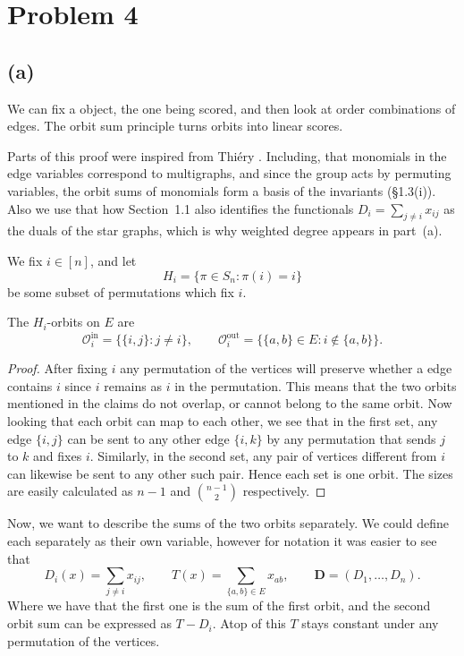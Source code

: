\documentclass[11pt]{scrartcl}
\begin{document}
\section{Problem 4}
\subsection{(a)}

\begin{soln}
    We can fix a object, the one being scored, and then look at order combinations of edges. The orbit sum principle turns orbits into linear scores. 
    \begin{remark}
            Parts of this proof were inspired from Thi\'ery \cite[Sections~1.1 and~1.3]{p4-thiery}.
    Including, that  monomials in the edge variables correspond to multigraphs, and since
the group acts by permuting variables, the orbit sums of monomials form
a basis of the invariants (\S1.3(i)). Also we use that how Section~1.1 also identifies the
functionals $D_i=\sum_{j\ne i}x_{ij}$ as the duals of the star
graphs, which is why weighted degree appears in part~(a).
    \end{remark}
    We fix $i\in[n]$, and let
    \[
    H_i=\{\pi\in S_n:\pi(i)=i\}
    \]
    be some subset of permutations which fix $i$.

    \begin{claim*}
	
        The $H_i$-orbits on $E$ are
        \[
        \mathcal O_i^{\mathrm{in}}
        =\{\{i,j\}:j\ne i\},
        \qquad
        \mathcal O_i^{\mathrm{out}}
        =\{\{a,b\}\in E:i\notin\{a,b\}\}.
        \]
    \end{claim*}

    \begin{proof}
		After fixing $i$ any permutation of the vertices will preserve whether a edge
		contains $i$ since $i$ remains as $i$ in the permutation. This means that the
		two orbits mentioned in the claims do not overlap, or cannot belong to the same 
		orbit. Now looking that each orbit can map to each other, we see that in the first
		set, any edge $\{i,j\}$ can be sent to any other edge $\{i,k\}$ by 
		any permutation that sends $j$ to $k$ and fixes $i$. 
		Similarly, in the second set, any pair of vertices different from $i$
        can likewise be sent to any other such pair.
        Hence each set is one orbit. The sizes are easily calculated as
        $n-1$ and $\binom{n-1}{2}$ respectively.
    \end{proof}
	Now, we want to describe the sums of the two orbits separately. We could define each separately 
    as their own variable, however for notation it was easier to see that 
    \[
    D_i(x)=\sum_{j\ne i}x_{ij},
    \qquad
    T(x)=\sum_{\{a,b\}\in E}x_{ab},
    \qquad
    \mathbf D=(D_1,\ldots,D_n).
    \]
    Where we have that the first one is the sum of the first orbit, and the second orbit sum can 
	be expressed as $T-D_i$. Atop of this $T$ stays constant under any permutation 
	of the vertices.


\end{soln}
\end{document}
